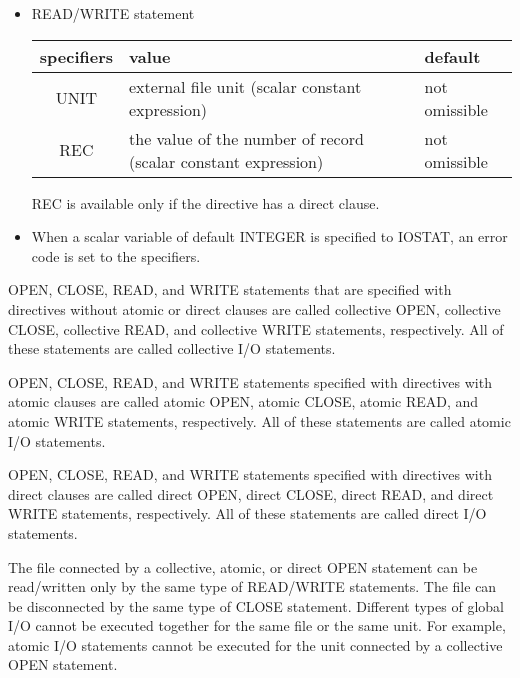 \begin{itemize}
    \item READ/WRITE statement

   \begin{table}[h]
    \begin{center}
     \label{tb:globalopen}
     \begin{tabular}{|c||p{90mm}|l|}
       \hline
      specifiers & value & default \\ \hline \hline
      UNIT & external file unit (scalar constant expression)
      & not omissible \\ \hline
      REC & the value of the number of record (scalar constant expression)
      & not omissible \\ \hline
     \end{tabular}
    \end{center}
   \end{table}

   REC is available only if the directive has a direct clause.
   
   \item When a scalar variable of default INTEGER is specified to IOSTAT, an
     error code is set to the specifiers.
	 
   \end{itemize}

   OPEN, CLOSE, READ, and WRITE statements that are specified with \gio directives
   without atomic or direct clauses are called collective OPEN, collective
   CLOSE, collective READ, and collective WRITE statements, respectively.
   All of these statements are called collective I/O statements.

   OPEN, CLOSE, READ, and WRITE statements specified with \gio directives
   with atomic clauses are called atomic OPEN, atomic CLOSE, atomic READ, and
   atomic WRITE statements, respectively.
   All of these statements are called atomic I/O statements.

   OPEN, CLOSE, READ, and WRITE statements specified with \gio directives
   with direct clauses are called direct OPEN, direct CLOSE, direct READ, and
   direct WRITE statements, respectively.
   All of these statements are called direct I/O statements.

   The file connected by a collective, atomic, or direct OPEN statement can
   be read/written only by the same type of READ/WRITE statements.
   The file can be disconnected by the same type of CLOSE statement.
   Different types of global I/O cannot be executed together for the same file or the
   same unit.
   For example, atomic I/O statements cannot be executed for the unit
   connected by a collective OPEN statement.

